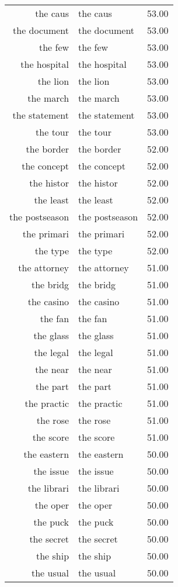 \begin{table}[ht]
\begin{tabular}{rlr}
  the caus & the caus & 53.00 \\ 
  the document & the document & 53.00 \\ 
  the few & the few & 53.00 \\ 
  the hospital & the hospital & 53.00 \\ 
  the lion & the lion & 53.00 \\ 
  the march & the march & 53.00 \\ 
  the statement & the statement & 53.00 \\ 
  the tour & the tour & 53.00 \\ 
  the border & the border & 52.00 \\ 
  the concept & the concept & 52.00 \\ 
  the histor & the histor & 52.00 \\ 
  the least & the least & 52.00 \\ 
  the postseason & the postseason & 52.00 \\ 
  the primari & the primari & 52.00 \\ 
  the type & the type & 52.00 \\ 
  the attorney & the attorney & 51.00 \\ 
  the bridg & the bridg & 51.00 \\ 
  the casino & the casino & 51.00 \\ 
  the fan & the fan & 51.00 \\ 
  the glass & the glass & 51.00 \\ 
  the legal & the legal & 51.00 \\ 
  the near & the near & 51.00 \\ 
  the part & the part & 51.00 \\ 
  the practic & the practic & 51.00 \\ 
  the rose & the rose & 51.00 \\ 
  the score & the score & 51.00 \\ 
  the eastern & the eastern & 50.00 \\ 
  the issue & the issue & 50.00 \\ 
  the librari & the librari & 50.00 \\ 
  the oper & the oper & 50.00 \\ 
  the puck & the puck & 50.00 \\ 
  the secret & the secret & 50.00 \\ 
  the ship & the ship & 50.00 \\ 
  the usual & the usual & 50.00 \\ 

\end{tabular}
\end{table}
